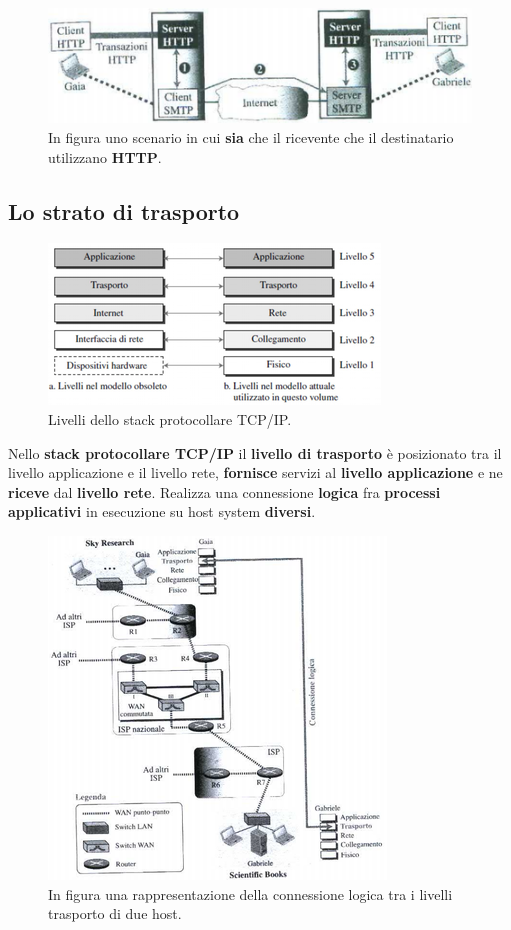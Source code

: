 \documentclass[11pt,a4paper]{article}
\theoremstyle{definition}
\begin{document}
\begin{figure}[!h]
	\includegraphics[scale=0.6]{Immagini/Web_mail1.png}
	\centering
	\caption{In figura uno scenario in cui \textbf{sia} che il ricevente che il destinatario utilizzano \textbf{HTTP}.}
\end{figure}
\subsection{Lo strato di trasporto}
\begin{figure}[!h]
	\includegraphics[scale=0.7]{Immagini/TCP_IP.png}
	\centering
	\caption{Livelli dello stack protocollare TCP/IP.}
\end{figure}
Nello \textbf{stack protocollare TCP/IP} il \textbf{livello di trasporto} è posizionato tra il livello applicazione e il livello rete, \textbf{fornisce} servizi al \textbf{livello applicazione} e ne \textbf{riceve} dal \textbf{livello rete}. Realizza una connessione \textbf{logica} fra \textbf{processi applicativi} in esecuzione su host system \textbf{diversi}.
\newpage
\begin{figure}[!h]
	\includegraphics[scale=0.7]{Immagini/Trasporto.png}
	\centering
	\caption{In figura una rappresentazione della connessione logica tra i livelli trasporto di due host.}
\end{figure}
\end{document}
